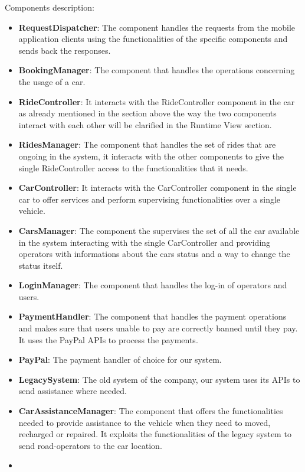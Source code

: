\documentclass[]{article}
\providecommand{\tightlist}{%
  \setlength{\itemsep}{0pt}\setlength{\parskip}{0pt}}
\begin{document}
Components description:

\begin{itemize}
\tightlist
\item
  \textbf{RequestDispatcher}: The component handles the requests from
  the mobile application clients using the functionalities of the
  specific components and sends back the responses.
\item
  \textbf{BookingManager}: The component that handles the operations
  concerning the usage of a car.
\item
  \textbf{RideController}: It interacts with the RideController
  component in the car as already mentioned in the section above the way
  the two components interact with each other will be clarified in the
  Runtime View section.
\item
  \textbf{RidesManager}: The component that handles the set of rides
  that are ongoing in the system, it interacts with the other components
  to give the single RideController access to the functionalities that
  it needs.
\item
  \textbf{CarController}: It interacts with the CarController component
  in the single car to offer services and perform supervising
  functionalities over a single vehicle.
\item
  \textbf{CarsManager}: The component the supervises the set of all the
  car available in the system interacting with the single CarController
  and providing operators with informations about the cars status and a
  way to change the status itself.
\item
  \textbf{LoginManager}: The component that handles the log-in of
  operators and users.
\item
  \textbf{PaymentHandler}: The component that handles the payment
  operations and makes sure that users unable to pay are correctly
  banned until they pay. It uses the PayPal APIs to process the
  payments.
\item
  \textbf{PayPal}: The payment handler of choice for our system.
\item
  \textbf{LegacySystem}: The old system of the company, our system uses
  its APIs to send assistance where needed.
\item
  \textbf{CarAssistanceManager}: The component that offers the
  functionalities needed to provide assistance to the vehicle when they
  need to moved, recharged or repaired. It exploits the functionalities
  of the legacy system to send road-operators to the car location.
\item

\end{itemize}
\end{document}
